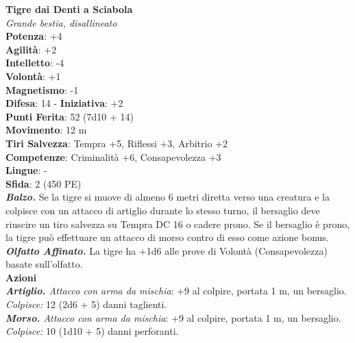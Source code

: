 \begin{multicols}{2}
\medskip\textbf{Tigre dai Denti a Sciabola}\\
\emph{Grande bestia, disallineato}\\
\textbf{Potenza}: +4\\
\textbf{Agilità}: +2\\
\textbf{Intelletto}: -4\\
\textbf{Volontà}: +1\\
\textbf{Magnetismo}: -1\\
\textbf{Difesa}: 14 - \textbf{Iniziativa}: +2\\
\textbf{Punti Ferita}: 52 (7d10 + 14)\\
\textbf{Movimento}: 12 m\\
\textbf{Tiri Salvezza}: Tempra +5, Riflessi +3, Arbitrio +2\\
\textbf{Competenze}: Criminalità +6, Consapevolezza +3\\
\textbf{Lingue}: -\\
\textbf{Sfida}: 2 (450 PE)\smallskip\\
\emph{\textbf{Balzo.}} Se la tigre si muove di almeno 6 metri diretta verso una creatura e la colpisce con un attacco di artiglio durante lo stesso turno, il bersaglio deve riuscire un tiro salvezza su Tempra DC  16 o cadere prono. Se il bersaglio è prono, la tigre può effettuare un attacco di morso contro di esso come azione bonus.\\
\emph{\textbf{Olfatto Affinato.}} La tigre ha +1d6 alle prove di Volontà (Consapevolezza) basate sull'olfatto.\\
\smallskip\textbf{Azioni}\\
\emph{\textbf{Artiglio.} Attacco con arma da mischia}: +9 al colpire, portata 1 m, un bersaglio.\\
\emph{Colpisce:} 12 (2d6 + 5) danni taglienti.\\
\emph{\textbf{Morso.} Attacco con arma da mischia}: +9 al colpire, portata 1 m, un bersaglio.\\
\emph{Colpisce:} 10 (1d10 + 5) danni perforanti.\\


\end{multicols}
